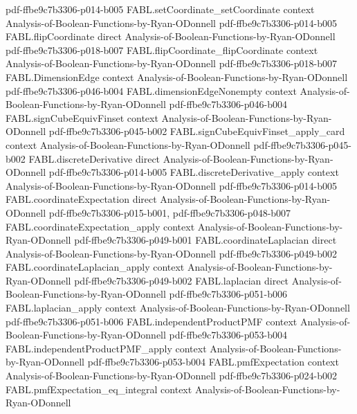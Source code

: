 \begin{theorem}
  {pdf-ffbe9c7b3306-p014-b005}
\proofstep
  {FABL.setCoordinate_setCoordinate}
  {context}
  {Analysis-of-Boolean-Functions-by-Ryan-ODonnell}
  {pdf-ffbe9c7b3306-p014-b005}
\proofstep
  {FABL.flipCoordinate}
  {direct}
  {Analysis-of-Boolean-Functions-by-Ryan-ODonnell}
  {pdf-ffbe9c7b3306-p018-b007}
\proofstep
  {FABL.flipCoordinate_flipCoordinate}
  {context}
  {Analysis-of-Boolean-Functions-by-Ryan-ODonnell}
  {pdf-ffbe9c7b3306-p018-b007}
\proofstep
  {FABL.DimensionEdge}
  {context}
  {Analysis-of-Boolean-Functions-by-Ryan-ODonnell}
  {pdf-ffbe9c7b3306-p046-b004}
\proofstep
  {FABL.dimensionEdgeNonempty}
  {context}
  {Analysis-of-Boolean-Functions-by-Ryan-ODonnell}
  {pdf-ffbe9c7b3306-p046-b004}
\proofstep
  {FABL.signCubeEquivFinset}
  {context}
  {Analysis-of-Boolean-Functions-by-Ryan-ODonnell}
  {pdf-ffbe9c7b3306-p045-b002}
\proofstep
  {FABL.signCubeEquivFinset_apply_card}
  {context}
  {Analysis-of-Boolean-Functions-by-Ryan-ODonnell}
  {pdf-ffbe9c7b3306-p045-b002}
\proofstep
  {FABL.discreteDerivative}
  {direct}
  {Analysis-of-Boolean-Functions-by-Ryan-ODonnell}
  {pdf-ffbe9c7b3306-p014-b005}
\proofstep
  {FABL.discreteDerivative_apply}
  {context}
  {Analysis-of-Boolean-Functions-by-Ryan-ODonnell}
  {pdf-ffbe9c7b3306-p014-b005}
\proofstep
  {FABL.coordinateExpectation}
  {direct}
  {Analysis-of-Boolean-Functions-by-Ryan-ODonnell}
  {pdf-ffbe9c7b3306-p015-b001,
    pdf-ffbe9c7b3306-p048-b007}
\proofstep
  {FABL.coordinateExpectation_apply}
  {context}
  {Analysis-of-Boolean-Functions-by-Ryan-ODonnell}
  {pdf-ffbe9c7b3306-p049-b001}
\proofstep
  {FABL.coordinateLaplacian}
  {direct}
  {Analysis-of-Boolean-Functions-by-Ryan-ODonnell}
  {pdf-ffbe9c7b3306-p049-b002}
\proofstep
  {FABL.coordinateLaplacian_apply}
  {context}
  {Analysis-of-Boolean-Functions-by-Ryan-ODonnell}
  {pdf-ffbe9c7b3306-p049-b002}
\proofstep
  {FABL.laplacian}
  {direct}
  {Analysis-of-Boolean-Functions-by-Ryan-ODonnell}
  {pdf-ffbe9c7b3306-p051-b006}
\proofstep
  {FABL.laplacian_apply}
  {context}
  {Analysis-of-Boolean-Functions-by-Ryan-ODonnell}
  {pdf-ffbe9c7b3306-p051-b006}
\proofstep
  {FABL.independentProductPMF}
  {context}
  {Analysis-of-Boolean-Functions-by-Ryan-ODonnell}
  {pdf-ffbe9c7b3306-p053-b004}
\proofstep
  {FABL.independentProductPMF_apply}
  {context}
  {Analysis-of-Boolean-Functions-by-Ryan-ODonnell}
  {pdf-ffbe9c7b3306-p053-b004}
\proofstep
  {FABL.pmfExpectation}
  {context}
  {Analysis-of-Boolean-Functions-by-Ryan-ODonnell}
  {pdf-ffbe9c7b3306-p024-b002}
\proofstep
  {FABL.pmfExpectation_eq_integral}
  {context}
  {Analysis-of-Boolean-Functions-by-Ryan-ODonnell}

\end{theorem}
